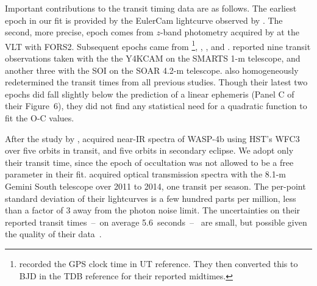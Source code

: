 \documentclass[12pt,twocolumn,tighten]{aastex62}
\begin{document}
Important contributions to the transit timing data are as follows.
The earliest epoch in our fit is provided by the EulerCam lightcurve
observed by \citet{wilson_wasp-4b_2008}.  The second, more precise,
epoch comes from $z$-band photometry acquired by
\citet{gillon_improved_2009} at the VLT with FORS2.  Subsequent epochs
came from \citet{winn_transit_2009}\footnote{\citet{winn_transit_2009}
recorded the GPS clock time in UT reference. They then converted this
to BJD in the TDB reference for their reported midtimes.},
\citet{dragomir_terms_2011}, \citet{sanchis-ojeda_starspots_2011}, and
\citet{nikolov_wasp-4b_2012}.
\citet{hoyer_tramos_2013} reported nine transit observations taken
with the the Y4KCAM on the SMARTS 1-m telescope, and another three
with the SOI on the SOAR 4.2-m telescope.  \citet{hoyer_tramos_2013}
also homogeneously redetermined the transit times from all previous
studies.  Though their latest two epochs did fall slightly below the
prediction of a linear ephemeris (Panel C of their Figure~6), they did
not find any statistical need for a quadratic function to fit the O-C
values.

After the study by \citet{hoyer_tramos_2013},
\citet{ranjan_atmospheric_2014} acquired near-IR spectra of WASP-4b
using HST's WFC3 over five orbits in transit, and five orbits in
secondary eclipse.  We adopt only their transit time, since the epoch
of occultation was not allowed to be a free parameter in their fit.
\citet{huitson_gemini_2017} acquired optical transmission spectra with
the 8.1-m Gemini South telescope over 2011 to 2014, one transit per
season.  The per-point standard deviation of their lightcurves is a
few hundred parts per million, less than a factor of 3 away from the
photon noise limit.  The uncertainties on their reported transit
times~--~on average 5.6~seconds~--~ are small, but possible given the
quality of their data~\citep[cf.][]{carter_analytic_2008}.
\end{document}
